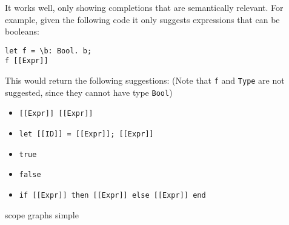 It works well, only showing completions that are semantically relevant. For example, given the following code it only suggests expressions that can be booleans:
\begin{lstlisting}
let f = \b: Bool. b;
f [[Expr]]
\end{lstlisting}
This would return the following suggestions: (Note that \verb|f| and \verb|Type| are not suggested, since they cannot have type \verb|Bool|)
 \begin{itemize}
 	\item \verb|[[Expr]] [[Expr]]|
 	\item \verb|let [[ID]] = [[Expr]]; [[Expr]]|
 	\item \verb|true|
 	\item \verb|false|
 	\item \verb|if [[Expr]] then [[Expr]] else [[Expr]] end|
 \end{itemize}





\todo{}
scope graphs simple